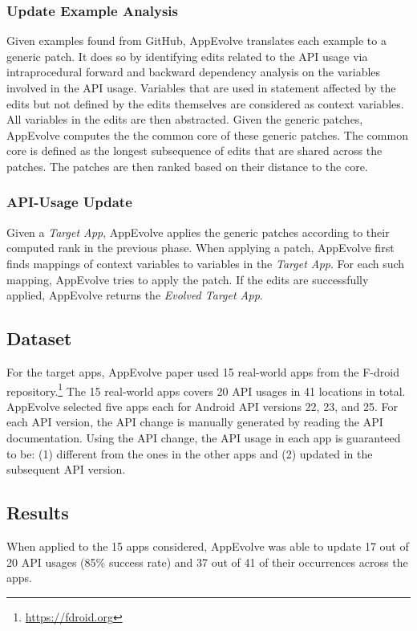 \subsubsection{Update Example Analysis}
Given examples found from GitHub, AppEvolve translates each example to a generic patch. It does so by identifying edits related to the API usage via intraprocedural forward and backward dependency analysis on the variables involved in the API usage. Variables that are used in statement affected by the edits but not defined by the edits themselves are considered as context variables. All variables in the edits are then abstracted. Given the generic patches, AppEvolve computes the the common core of these generic patches. The common core is defined as the longest subsequence of edits that are shared across the patches. The patches are then ranked based on their distance to the core.

\subsubsection{API-Usage Update}
Given a {\em Target App}, AppEvolve applies the generic patches according to their computed rank in the previous phase. When applying a patch, AppEvolve first finds mappings of context variables to variables in the {\em Target App}. For each such mapping, AppEvolve tries to apply the patch. If the edits are successfully applied, AppEvolve returns the {\em Evolved Target App}.

\subsection{Dataset}
For the target apps, AppEvolve paper used 15 real-world apps from the F-droid repository.\footnote{\url{https://fdroid.org}} The 15 real-world apps covers 20 API usages in 41 locations in total. AppEvolve selected five apps each for Android API versions 22, 23, and 25. For each API version, the API change is manually generated by reading the API
documentation. Using the API change, the API usage in each app is guaranteed to be: (1) different from the ones in the other apps and (2)
updated in the subsequent API version. 

\subsection{Results}
When applied to the 15 apps considered, AppEvolve was able to update 17 out of 20 API usages (85\% success rate) and 37 out of 41 of their occurrences across the apps.